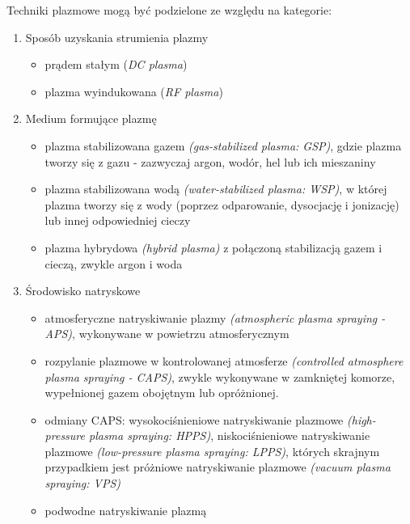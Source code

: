 \documentclass[13pt]{article}
\begin{document}
Techniki plazmowe mogą być podzielone ze względu na kategorie: \cite{therm}
\begin{enumerate}
\item Sposób uzyskania strumienia plazmy
\begin{itemize}
\item prądem stałym (\textit{DC plasma})
\item plazma wyindukowana (\textit{RF plasma})
\end{itemize}
\item Medium formujące plazmę
\begin{itemize}
\item plazma stabilizowana gazem \textit{(gas-stabilized plasma: GSP)}, gdzie plazma tworzy się z gazu -  zazwyczaj argon, wodór, hel lub ich mieszaniny
\item plazma stabilizowana wodą \textit{(water-stabilized plasma: WSP)}, w której plazma tworzy się z wody (poprzez odparowanie, dysocjację i jonizację) lub innej odpowiedniej cieczy
\item plazma hybrydowa \textit{(hybrid plasma)} z połączoną stabilizacją gazem i cieczą, zwykle argon i woda
\end{itemize}
\item Środowisko natryskowe
\begin{itemize}
\item atmosferyczne natryskiwanie plazmy \textit{(atmospheric plasma spraying - APS)}, wykonywane w powietrzu atmosferycznym
\item rozpylanie plazmowe w kontrolowanej atmosferze \textit{(controlled atmosphere plasma spraying - CAPS)}, zwykle wykonywane w zamkniętej komorze, wypełnionej gazem obojętnym lub opróżnionej. 
\item odmiany CAPS: wysokociśnieniowe natryskiwanie plazmowe \textit{(high-pressure plasma spraying: HPPS)}, niskociśnieniowe natryskiwanie plazmowe \textit{(low-pressure plasma spraying: LPPS)}, których skrajnym przypadkiem jest próżniowe natryskiwanie plazmowe \textit{(vacuum plasma spraying: VPS)}
\item podwodne natryskiwanie plazmą
\end{itemize}
\end{enumerate}
\end{document}
